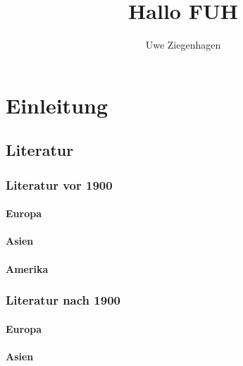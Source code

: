 \documentclass[12pt,ngerman,parskip=half]{scrreprt}
\title{Hallo FUH}
\author{Uwe Ziegenhagen}
\begin{document}
\maketitle


\chapter{Einleitung}
\section{Literatur}
\subsection{Literatur vor 1900}


\subsubsection{Europa}

\blindtext 

\blindtext

\blindtext

\subsubsection{Asien}

\blindtext 

\blindtext

\blindtext

\subsubsection{Amerika}

\blindtext 

\blindtext

\blindtext

\subsection{Literatur nach 1900}

\subsubsection{Europa}

\blindtext 

\blindtext

\blindtext

\subsubsection{Asien}
\end{document}
